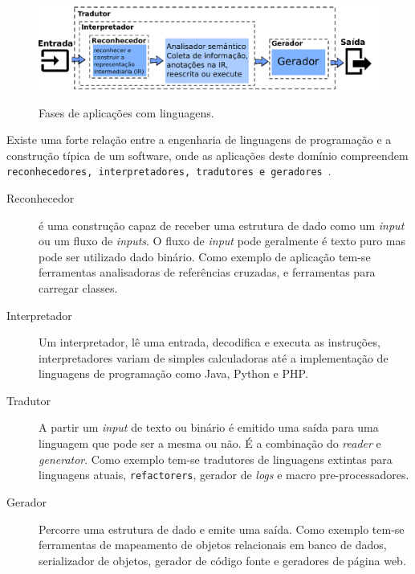 \begin{figure}[h]
  \center
  \includegraphics[scale=0.9]{Imagens/stagesLanguageApp}
  \label{fig:stagesLanguageApp}
  \caption{Fases de aplicações com linguagens.}
\end{figure}

Existe uma forte relação entre a engenharia de linguagens de programação e a construção típica de um software, onde as aplicações deste domínio compreendem \texttt{reconhecedores, interpretadores, tradutores e geradores}~\cite{Parr:2009:LIP:1823613}. 

\begin{description}

\item[Reconhecedor] é uma construção capaz de receber uma estrutura de dado como um \textit{input} ou um fluxo de \textit{inputs}. O fluxo de \textit{input} pode geralmente é texto puro mas pode ser utilizado dado binário. Como exemplo de aplicação tem-se ferramentas analisadoras de referências cruzadas, e ferramentas para carregar classes.

\item[Interpretador] Um interpretador, lê uma entrada, decodifica e executa as instruções, interpretadores variam de simples calculadoras até a implementação de linguagens de programação como Java, Python e PHP.

\item[Tradutor]A partir um \textit{input} de texto ou binário é emitido uma saída para uma linguagem que pode ser a mesma ou não. É a combinação do \textit{reader} e \textit{generator}. Como exemplo tem-se tradutores de linguagens extintas para linguagens atuais, \texttt{refactorers},  gerador de \textit{logs} e macro pre-processadores.
	
\item[Gerador] Percorre uma estrutura de dado e emite uma saída. Como exemplo tem-se ferramentas de mapeamento de objetos relacionais em banco de dados, serializador de objetos, gerador de código fonte e geradores de página web.

\end{description}


